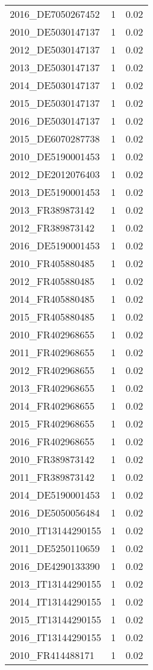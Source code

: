 \begin{table*}[htbp]
\begin{tabular}{lrr}
2016_DE7050267452 & 1 & 0.02 \\
2010_DE5030147137 & 1 & 0.02 \\
2012_DE5030147137 & 1 & 0.02 \\
2013_DE5030147137 & 1 & 0.02 \\
2014_DE5030147137 & 1 & 0.02 \\
2015_DE5030147137 & 1 & 0.02 \\
2016_DE5030147137 & 1 & 0.02 \\
2015_DE6070287738 & 1 & 0.02 \\
2010_DE5190001453 & 1 & 0.02 \\
2012_DE2012076403 & 1 & 0.02 \\
2013_DE5190001453 & 1 & 0.02 \\
2013_FR389873142 & 1 & 0.02 \\
2012_FR389873142 & 1 & 0.02 \\
2016_DE5190001453 & 1 & 0.02 \\
2010_FR405880485 & 1 & 0.02 \\
2012_FR405880485 & 1 & 0.02 \\
2014_FR405880485 & 1 & 0.02 \\
2015_FR405880485 & 1 & 0.02 \\
2010_FR402968655 & 1 & 0.02 \\
2011_FR402968655 & 1 & 0.02 \\
2012_FR402968655 & 1 & 0.02 \\
2013_FR402968655 & 1 & 0.02 \\
2014_FR402968655 & 1 & 0.02 \\
2015_FR402968655 & 1 & 0.02 \\
2016_FR402968655 & 1 & 0.02 \\
2010_FR389873142 & 1 & 0.02 \\
2011_FR389873142 & 1 & 0.02 \\
2014_DE5190001453 & 1 & 0.02 \\
2016_DE5050056484 & 1 & 0.02 \\
2010_IT13144290155 & 1 & 0.02 \\
2011_DE5250110659 & 1 & 0.02 \\
2016_DE4290133390 & 1 & 0.02 \\
2013_IT13144290155 & 1 & 0.02 \\
2014_IT13144290155 & 1 & 0.02 \\
2015_IT13144290155 & 1 & 0.02 \\
2016_IT13144290155 & 1 & 0.02 \\
2010_FR414488171 & 1 & 0.02 \\

\end{tabular}
\end{table*}
